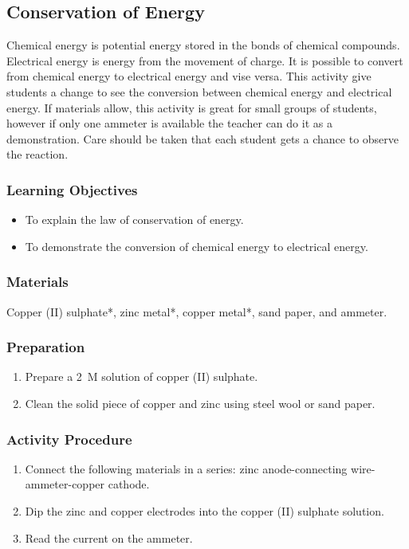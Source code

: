 \subsection{Conservation of Energy}
Chemical energy is potential energy stored in the bonds of chemical compounds. Electrical energy is energy from the movement of charge. It is possible to convert from chemical energy to electrical energy and vise versa. This activity give students a change to see the conversion between chemical energy and electrical energy. If materials allow, this activity is great for small groups of students, however if only one ammeter is available the teacher can do it as a demonstration. Care should be taken that each student gets a chance to observe the reaction. 
\subsubsection*{Learning Objectives}
\begin{itemize}
\item{To explain the law of conservation of energy.}
\item{To demonstrate the conversion of chemical energy to electrical energy.}
\end{itemize}

\subsubsection*{Materials}
Copper (II) sulphate*, zinc metal*, copper metal*, sand paper, and ammeter.

\subsubsection*{Preparation}
\begin{enumerate}
\item{Prepare a 2~M solution of copper (II) sulphate.}
\item{Clean the solid piece of copper and zinc using steel wool or sand paper.}
\end{enumerate}

\subsubsection*{Activity Procedure}
\begin{enumerate}
\item{Connect the following materials in a series: zinc anode-connecting wire-ammeter-copper cathode.}
\item{Dip the zinc and copper electrodes into the copper (II) sulphate solution.}
\item{Read the current on the ammeter.}
\end{enumerate}

